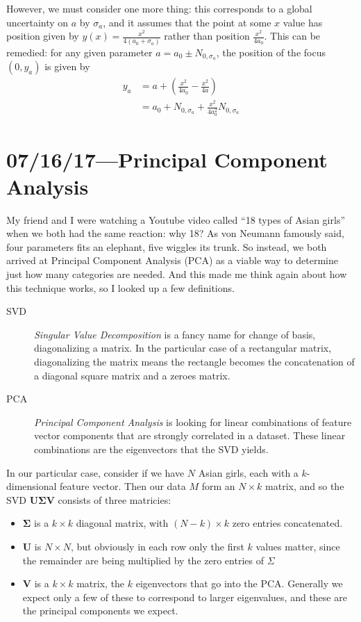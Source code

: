 \documentclass[12pt]{report}
\newcommand*{\bm}[1]{\boldsymbol{\mathbf{#1}}}
\begin{document}
However, we must consider one more thing: this corresponds to a global
uncertainty on $a$ by $\sigma_a$, and it assumes that the point at some $x$
value has position given by $y(x) = \frac{x^2}{4 (a_0 + \sigma_a)}$ rather than
position $\frac{x^2}{4 a_0}$. This can be remedied: for any given parameter $a =
a_0 \pm N_{0, \sigma_a}$, the position of the focus $(0, y_a)$ is given by
\begin{align*}
    y_a
        &= a + \left(\frac{x^2}{4a_0} - \frac{x^2}{4 a}\right)\\
        &= a_0 + N_{0, \sigma_a} + \frac{x^2}{4a_0^2}N_{0, \sigma_a}
\end{align*}

\chapter{07/16/17---Principal Component Analysis}

My friend and I were watching a Youtube video called ``18 types of Asian girls''
when we both had the same reaction: why 18? As von Neumann famously said, four
parameters fits an elephant, five wiggles its trunk. So instead, we both arrived
at Principal Component Analysis (PCA) as a viable way to determine just how many
categories are needed. And this made me think again about how this technique
works, so I looked up a few definitions.

\begin{description}
    \item[SVD] \emph{Singular Value Decomposition} is a fancy name for
        change of basis, diagonalizing a matrix. In the particular case of a
        rectangular matrix, diagonalizing the matrix means the rectangle becomes
        the concatenation of a diagonal square matrix and a zeroes matrix.

    \item[PCA] \emph{Principal Component Analysis} is looking for linear
        combinations of feature vector components that are strongly correlated
        in a dataset. These linear combinations are the eigenvectors that the
        SVD yields.
\end{description}

In our particular case, consider if we have $N$ Asian girls, each with a
$k$-dimensional feature vector. Then our data $M$ form an $N \times k$ matrix, and
so the SVD $\bm{U\Sigma V}$ consists of three matricies:
\begin{itemize}
    \item $\bm{\Sigma}$ is a $k \times k$ diagonal matrix, with $(N - k) \times
        k$ zero entries concatenated.
    \item $\bm{U}$ is $N \times N$, but obviously in each row only the first $k$
        values matter, since the remainder are being multiplied by the zero
        entries of $\Sigma$
    \item $\bm{V}$ is a $k \times k$ matrix, the $k$ eigenvectors that go into
        the PCA\@. Generally we expect only a few of these to correspond to larger
        eigenvalues, and these are the principal components we expect.
\end{itemize}
\end{document}

